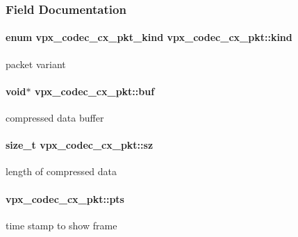 \subsubsection{Field Documentation}
\hypertarget{structvpx__codec__cx__pkt_a41f395b39516343c1329a4a85a0084f2}{
\paragraph[{kind}]{\setlength{\rightskip}{0pt plus 5cm}enum {\bf vpx\-\_\-codec\-\_\-cx\-\_\-pkt\-\_\-kind} vpx\-\_\-codec\-\_\-cx\-\_\-pkt\-::kind}}\label{structvpx__codec__cx__pkt_a41f395b39516343c1329a4a85a0084f2}
packet variant \hypertarget{structvpx__codec__cx__pkt_a9e1db068593b6037e70b05b5239784d2}{
\paragraph[{buf}]{\setlength{\rightskip}{0pt plus 5cm}void$\ast$ vpx\-\_\-codec\-\_\-cx\-\_\-pkt\-::buf}}\label{structvpx__codec__cx__pkt_a9e1db068593b6037e70b05b5239784d2}
compressed data buffer \hypertarget{structvpx__codec__cx__pkt_a857321ba2dc65e81c430d14c36a542d9}{
\paragraph[{sz}]{\setlength{\rightskip}{0pt plus 5cm}size\-\_\-t vpx\-\_\-codec\-\_\-cx\-\_\-pkt\-::sz}}\label{structvpx__codec__cx__pkt_a857321ba2dc65e81c430d14c36a542d9}
length of compressed data \hypertarget{structvpx__codec__cx__pkt_aa75fe039fe6b47fb25d20684864bef12}{
\paragraph[{pts}]{ vpx\-\_\-codec\-\_\-cx\-\_\-pkt\-::pts}}\label{structvpx__codec__cx__pkt_aa75fe039fe6b47fb25d20684864bef12}
\begin{DoxyVerb}time stamp to show frame
\end{DoxyVerb}
